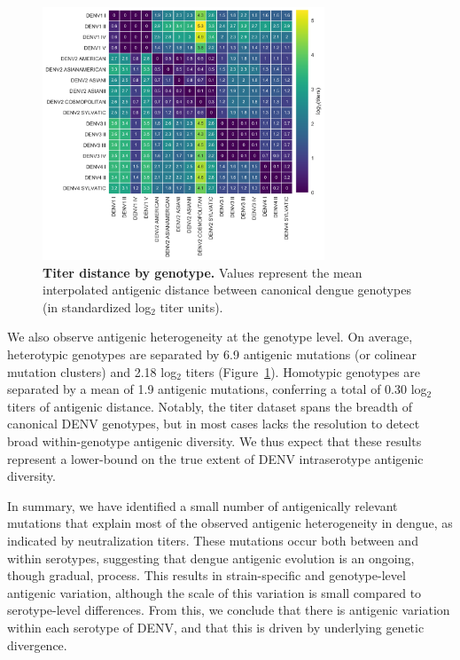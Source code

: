 \documentclass[11pt,oneside,letterpaper]{article}
\begin{document}
\begin{figure}[ht]
\centering
	\includegraphics[width=0.75\textwidth]{../figures/png/genotype_dTiter_heatmap.png}
	\caption{\textbf{Titer distance by genotype.}
  Values represent the mean interpolated antigenic distance between canonical dengue genotypes (in standardized log$_2$ titer units).
  }
	\label{genotype_dTiter_heatmap}
\end{figure}

We also observe antigenic heterogeneity at the genotype level.
On average, heterotypic genotypes are separated by 6.9 antigenic mutations (or colinear mutation clusters) and 2.18 log$_2$ titers (Figure~\ref{genotype_dTiter_heatmap}).
Homotypic genotypes are separated by a mean of 1.9 antigenic mutations, conferring a total of 0.30 log$_2$ titers of antigenic distance.
Notably, the titer dataset spans the breadth of canonical DENV genotypes, but in most cases lacks the resolution to detect broad within-genotype antigenic diversity.
We thus expect that these results represent a lower-bound on the true extent of DENV intraserotype antigenic diversity.

In summary, we have identified a small number of antigenically relevant mutations that explain most of the observed antigenic heterogeneity in dengue, as indicated by neutralization titers.
These mutations occur both between and within serotypes, suggesting that dengue antigenic evolution is an ongoing, though gradual, process.
This results in strain-specific and genotype-level antigenic variation, although the scale of this variation is small compared to serotype-level differences.
From this, we conclude that there is antigenic variation within each serotype of DENV, and that this is driven by underlying genetic divergence.
\end{document}
